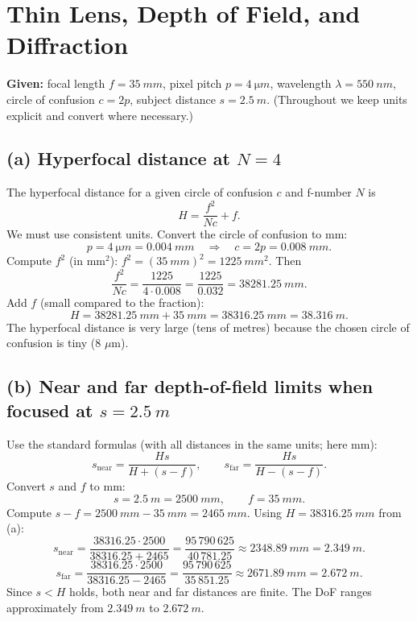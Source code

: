 \documentclass[12pt,a4paper]{article}
\begin{document}
\section{Thin Lens, Depth of Field, and Diffraction}

\textbf{Given:} focal length \(f=\SI{35}{mm}\), pixel pitch \(p=\SI{4}{\micro m}\), wavelength \(\lambda=\SI{550}{nm}\),
circle of confusion \(c=2p\), subject distance \(s=\SI{2.5}{m}\).  
(Throughout we keep units explicit and convert where necessary.)

\bigskip

\subsection*{(a) Hy\-per\-fo\-cal distance at \(N=4\)}

The hyperfocal distance for a given circle of confusion \(c\) and f-number \(N\) is
\[
H=\frac{f^2}{N c}+f.
\]
We must use consistent units. Convert the circle of confusion to \(\mathrm{mm}\):
\[
p=\SI{4}{\micro m}=\SI{0.004}{mm}\quad\Rightarrow\quad c=2p=\SI{0.008}{mm}.
\]
Compute \(f^2\) (in \(\text{mm}^2\)): \(f^2=(\SI{35}{mm})^2=\SI{1225}{mm^2}\).
Then
\[
\frac{f^2}{N c}=\frac{1225}{4\cdot 0.008}=\frac{1225}{0.032}=\SI{38281.25}{mm}.
\]
Add \(f\) (small compared to the fraction):
\[
H=\SI{38281.25}{mm}+\SI{35}{mm}=\SI{38316.25}{mm}=\boxed{\SI{38.316}{m}}.
\]
The hyperfocal distance is very large (tens of metres) because the chosen circle of confusion is tiny (8 $\mu$m).

\bigskip

\subsection*{(b) Near and far depth-of-field limits when focused at \(s=\SI{2.5}{m}\)}

Use the standard formulas (with all distances in the same units; here \(\mathrm{mm}\)):
\[
s_{\text{near}}=\frac{H s}{H+(s-f)},\qquad
s_{\text{far}}=\frac{H s}{H-(s-f)}.
\]
Convert \(s\) and \(f\) to \(\mathrm{mm}\):
\[
s=\SI{2.5}{m}=\SI{2500}{mm},\qquad f=\SI{35}{mm}.
\]
Compute \(s-f=\SI{2500}{mm}-\SI{35}{mm}=\SI{2465}{mm}\). Using \(H=\SI{38316.25}{mm}\) from (a):
\[
s_{\text{near}}=\frac{38316.25\cdot 2500}{38316.25+2465}
=\frac{95\,790\,625}{40\,781.25}\approx\SI{2348.89}{mm}=\boxed{\SI{2.349}{m}}.
\]
\[
s_{\text{far}}=\frac{38316.25\cdot 2500}{38316.25-2465}
=\frac{95\,790\,625}{35\,851.25}\approx\SI{2671.89}{mm}=\boxed{\SI{2.672}{m}}.
\]
Since \(s<H\) holds, both near and far distances are finite. The DoF ranges approximately from \(\SI{2.349}{m}\) to \(\SI{2.672}{m}\).
\end{document}
